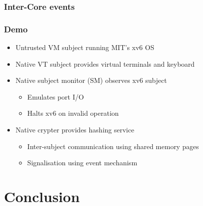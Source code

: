 \documentclass[xcolor={dvipsnames}]{beamer}
\begin{document}
\begin{frame}\frametitle{Inter-Core events}
\begin{center}
	
\end{center}
\end{frame}

\begin{frame}\frametitle{Demo}
\begin{itemize}
	\item Untrusted VM subject running MIT's xv6 OS
	\item Native VT subject provides virtual terminals and keyboard
	\item Native subject monitor (SM) observes xv6 subject
	\begin{itemize}
		\item Emulates port I/O
		\item Halts xv6 on invalid operation
	\end{itemize}
	\item Native crypter provides hashing service
	\begin{itemize}
		\item Inter-subject communication using shared memory pages
		\item Signalisation using event mechanism
	\end{itemize}
\end{itemize}
\begin{center}
	
\end{center}
\end{frame}

\section{Conclusion}
\end{document}
